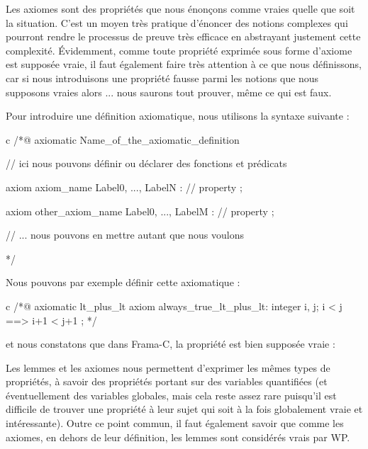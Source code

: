 Les axiomes sont des propriétés que nous énonçons comme vraies quelle
que soit la situation. C'est un moyen très pratique d'énoncer des notions
complexes qui pourront rendre le processus de preuve très efficace en abstrayant
justement cette complexité. Évidemment, comme toute propriété exprimée sous
forme d'axiome est supposée vraie, il faut également faire très attention à ce que nous
définissons, car si nous introduisons une propriété fausse parmi les notions que
nous supposons vraies alors ... nous saurons tout prouver, même ce qui est faux.





Pour introduire une définition axiomatique, nous utilisons la syntaxe suivante :



\begin{CodeBlock}{c}
/*@
  axiomatic Name_of_the_axiomatic_definition {
    // ici nous pouvons définir ou déclarer des fonctions et prédicats

    axiom axiom_name { Label0, ..., LabelN }:
      // property ;

    axiom other_axiom_name { Label0, ..., LabelM }:
      // property ;

    // ... nous pouvons en mettre autant que nous voulons
  }
*/
\end{CodeBlock}



Nous pouvons par exemple définir cette axiomatique :



\begin{CodeBlock}{c}
/*@
  axiomatic lt_plus_lt{
    axiom always_true_lt_plus_lt:
      \forall integer i, j; i < j ==> i+1 < j+1 ;
  }
*/
\end{CodeBlock}



et nous constatons que dans Frama-C, la propriété est bien supposée
vraie :






Les lemmes et les axiomes nous permettent d'exprimer les mêmes types de
propriétés, à savoir des propriétés portant sur des variables quantifiées (et
éventuellement des variables globales, mais cela reste assez rare puisqu'il est
difficile de trouver une propriété à leur sujet qui soit à la fois globalement
vraie et intéressante). Outre ce point commun, il faut également savoir que
comme les axiomes, en dehors de leur définition, les lemmes sont considérés
vrais par WP.




